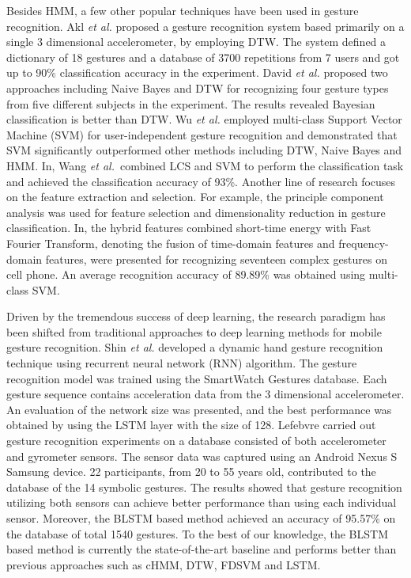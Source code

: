 \documentclass[review]{elsarticle}
\newcommand{\etal}{\textit{et al.}}
\begin{document}
{Besides HMM, a few other popular techniques have been used in gesture recognition. Akl \etal\; proposed a gesture recognition system based primarily on a single 3 dimensional accelerometer, by employing DTW\;\cite{akl2010accelerometer-based}.} The system defined a dictionary of 18 gestures and a database of 3700 repetitions from 7 users{ and got up to 90\% classification accuracy in the experiment.} David \etal\;\cite{Mace2013Accelerometer} proposed two approaches including Naive Bayes and DTW for recognizing four gesture types from five different subjects in the experiment. The results revealed Bayesian classification is better than DTW. Wu \etal\;\cite{wu2009gesture} employed multi-class Support Vector Machine (SVM) for user-independent gesture recognition and demonstrated that SVM significantly outperformed other methods including DTW, Naive Bayes and HMM. In\;\cite{Hsu2009Integrating}, Wang \etal~combined LCS and SVM to perform the classification task and achieved the classification accuracy of 93\%. Another line of research focuses on the feature extraction and selection. For example, the principle component analysis was used for feature selection and dimensionality reduction in gesture classification\;\cite{Marasovic2011Accelerometer}. {In\;\cite{He2011Accelerometer}, the hybrid features combined short-time energy with Fast Fourier Transform, denoting the fusion of time-domain features and frequency-domain features, were presented for recognizing seventeen complex gestures on cell phone.}
An average recognition accuracy of 89.89\% was obtained using multi-class SVM.

{Driven by the tremendous success of deep learning, the research paradigm has been shifted from traditional approaches to deep learning methods for mobile gesture recognition\;\cite{shin2016dynamic,lefebvre2013ANN}.} Shin \etal\;\cite{shin2016dynamic} developed a dynamic hand gesture recognition technique using recurrent neural network (RNN) algorithm. The gesture recognition model was trained using the SmartWatch Gestures database\;\cite{costante2014eusipco}. Each gesture sequence contains acceleration data from the 3 dimensional accelerometer. An evaluation of the network size was presented, and the best performance was obtained by using the LSTM layer with the size of 128.  Lefebvre\;\cite{lefebvre2013ANN} carried out gesture recognition experiments on a database consisted of both accelerometer and gyrometer sensors. The sensor data was captured using an Android Nexus S Samsung device. 22 participants, from 20 to 55 years old, contributed to the database of the 14 symbolic gestures. The results showed that gesture recognition utilizing both sensors can achieve better performance than using each individual sensor. {Moreover, the BLSTM based method achieved an accuracy of 95.57\% on the database of total 1540 gestures. To the best of our knowledge, the BLSTM based method is currently the state-of-the-art baseline and performs better than previous approaches such as cHMM, DTW, FDSVM and LSTM}.
\end{document}
